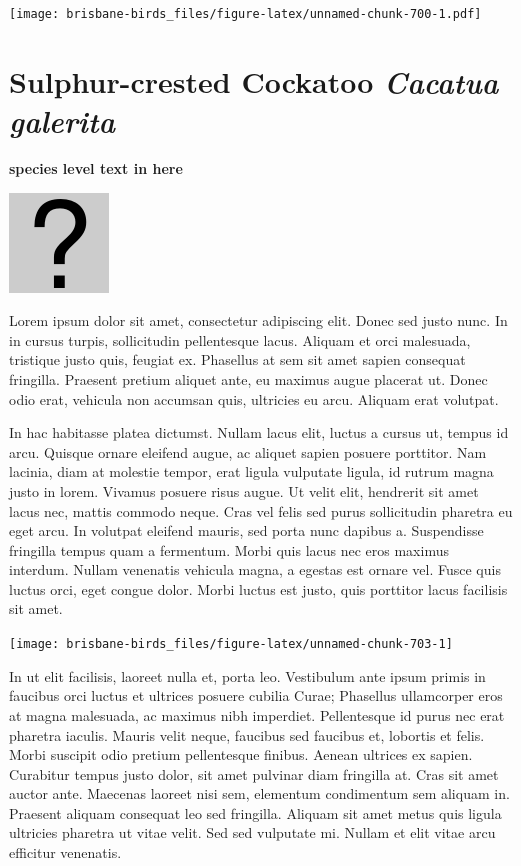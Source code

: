 \documentclass[]{book}
\let\origfigure\figure
\let\endorigfigure\endfigure
\renewenvironment{figure}[1][2] {
  \expandafter\origfigure\expandafter[H]
} {
  \endorigfigure
}
\begin{document}
\texttt{[image: brisbane-birds\_files/figure-latex/unnamed-chunk-700-1.pdf]}

\section{\texorpdfstring{Sulphur-crested Cockatoo \emph{Cacatua
galerita}}{Sulphur-crested Cockatoo Cacatua galerita}}\label{sulphur-crested-cockatoo-cacatua-galerita}

\textbf{species level text in here}

\begin{figure}
\centering
\includegraphics{assets/missing.png}
\caption{No image for species}
\end{figure}

Lorem ipsum dolor sit amet, consectetur adipiscing elit. Donec sed justo
nunc. In in cursus turpis, sollicitudin pellentesque lacus. Aliquam et
orci malesuada, tristique justo quis, feugiat ex. Phasellus at sem sit
amet sapien consequat fringilla. Praesent pretium aliquet ante, eu
maximus augue placerat ut. Donec odio erat, vehicula non accumsan quis,
ultricies eu arcu. Aliquam erat volutpat.

In hac habitasse platea dictumst. Nullam lacus elit, luctus a cursus ut,
tempus id arcu. Quisque ornare eleifend augue, ac aliquet sapien posuere
porttitor. Nam lacinia, diam at molestie tempor, erat ligula vulputate
ligula, id rutrum magna justo in lorem. Vivamus posuere risus augue. Ut
velit elit, hendrerit sit amet lacus nec, mattis commodo neque. Cras vel
felis sed purus sollicitudin pharetra eu eget arcu. In volutpat eleifend
mauris, sed porta nunc dapibus a. Suspendisse fringilla tempus quam a
fermentum. Morbi quis lacus nec eros maximus interdum. Nullam venenatis
vehicula magna, a egestas est ornare vel. Fusce quis luctus orci, eget
congue dolor. Morbi luctus est justo, quis porttitor lacus facilisis sit
amet.

\begin{figure}
\texttt{[image: brisbane-birds\_files/figure-latex/unnamed-chunk-703-1]} \caption{insert figure caption}\label{fig:unnamed-chunk-703}
\end{figure}

In ut elit facilisis, laoreet nulla et, porta leo. Vestibulum ante ipsum
primis in faucibus orci luctus et ultrices posuere cubilia Curae;
Phasellus ullamcorper eros at magna malesuada, ac maximus nibh
imperdiet. Pellentesque id purus nec erat pharetra iaculis. Mauris velit
neque, faucibus sed faucibus et, lobortis et felis. Morbi suscipit odio
pretium pellentesque finibus. Aenean ultrices ex sapien. Curabitur
tempus justo dolor, sit amet pulvinar diam fringilla at. Cras sit amet
auctor ante. Maecenas laoreet nisi sem, elementum condimentum sem
aliquam in. Praesent aliquam consequat leo sed fringilla. Aliquam sit
amet metus quis ligula ultricies pharetra ut vitae velit. Sed sed
vulputate mi. Nullam et elit vitae arcu efficitur venenatis.
\end{document}
